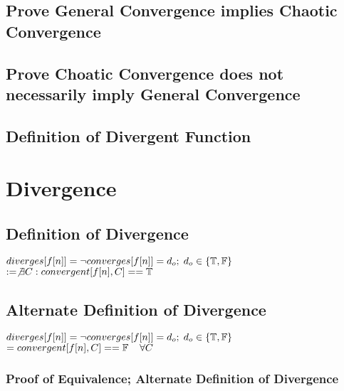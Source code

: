 \documentclass[11pt]{article}
\begin{document}
\subsection{Prove General Convergence implies Chaotic Convergence}
\subsection{Prove Choatic Convergence does not necessarily imply General Convergence}




\subsection{Definition of Divergent Function}



\section{Divergence}
\subsection{Definition of Divergence}
\begin{center}
\vspace{1mm}
$
diverges \lbrack f \lbrack n \rbrack \rbrack = \lnot converges[f[n]] = d_o; \hspace{1mm} d_o \in \{\mathbb{T},\mathbb{F}\}
$
\\ \vspace{4mm}
$
:= \not \exists C : convergent[f[n],C] == \mathbb{T}
$
\end{center}





\subsection{Alternate Definition of Divergence}
\begin{center}
\vspace{1mm}
$diverges \lbrack f \lbrack n \rbrack \rbrack = \lnot converges[f[n]] = d_o; \hspace{1mm} d_o \in \{\mathbb{T},\mathbb{F}\}$
\\ \vspace{4mm}
$
= convergent[f[n],C] == \mathbb{F} \hspace{4mm} \forall C
$
\end{center}
\subsubsection{Proof of Equivalence; Alternate Definition of Divergence}
\end{document}
